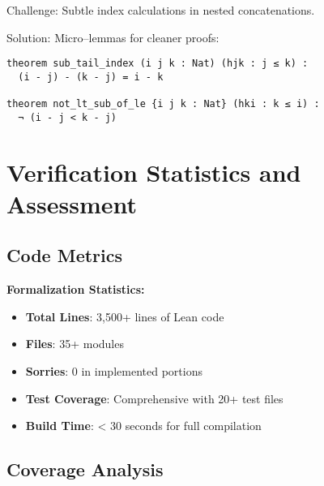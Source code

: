 \documentclass[11pt]{article}
\newif\iffullversion
\theoremstyle{definition}
\theoremstyle{remark}
\begin{document}
Challenge: Subtle index calculations in nested concatenations.

Solution: Micro--lemmas for cleaner proofs:
\begin{lstlisting}[language={}]
theorem sub_tail_index (i j k : Nat) (hjk : j ≤ k) :
  (i - j) - (k - j) = i - k

theorem not_lt_sub_of_le {i j k : Nat} (hki : k ≤ i) :
  ¬ (i - j < k - j)
\end{lstlisting}
\fi %

\iffullversion
\section{Verification Statistics and Assessment}

\subsection{Code Metrics}

\begin{mdframed}[style=technical]
\textbf{Formalization Statistics:}
\begin{itemize}
\item \textbf{Total Lines}: 3,500+ lines of Lean code
\item \textbf{Files}: 35+ modules
\item \textbf{Sorries}: 0 in implemented portions
\item \textbf{Test Coverage}: Comprehensive with 20+ test files
\item \textbf{Build Time}: < 30 seconds for full compilation
\end{itemize}
\end{mdframed}

\subsection{Coverage Analysis}
\end{document}
